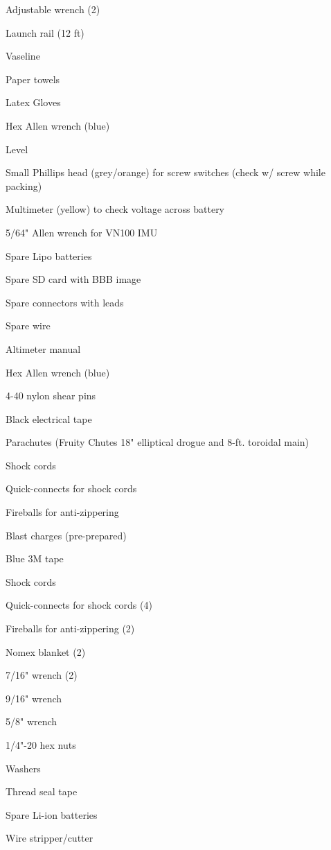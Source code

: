 \begin{multicols}{2}
\begin{todolist}
			\item Adjustable wrench (2)
			\item Launch rail (12 ft)
			\item Vaseline
			\item Paper towels
			\item Latex Gloves
			\item Hex Allen wrench (blue)
			\item Level
			\item Small Phillips head (grey/orange) for screw switches (check w/ screw while packing)
			\item Multimeter (yellow) to check voltage across battery
			\item 5/64" Allen wrench for VN100 IMU
			\item Spare Lipo batteries
			\item Spare SD card with BBB image
			\item Spare connectors with leads
			\item Spare wire
			\item Altimeter manual
			\item Hex Allen wrench (blue)
			\item 4-40 nylon shear pins
			\item Black electrical tape
			\item Parachutes (Fruity Chutes 18" elliptical drogue and 8-ft. toroidal main)
			\item Shock cords
			\item Quick-connects for shock cords
			\item Fireballs for anti-zippering
			\item Blast charges (pre-prepared)
			\item Blue 3M tape
			\item Shock cords
			\item Quick-connects for shock cords (4)
			\item Fireballs for anti-zippering (2)
			\item Nomex blanket (2)
			\item 7/16" wrench (2)
			\item 9/16" wrench
			\item 5/8" wrench
			\item 1/4"-20 hex nuts
			\item Washers
			\item Thread seal tape
			\item Spare Li-ion batteries
			\item Wire stripper/cutter

\end{todolist}
\end{multicols}
